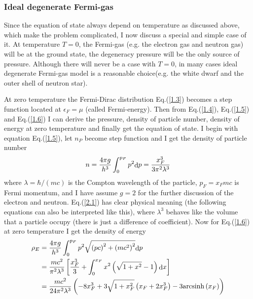 \documentclass[preprint]{revtex4-1}
\begin{document}
\subsubsection{Ideal degenerate Fermi-gas}
Since the equation of state always depend on temperature as discussed above, which make the problem complicated, I now discuss a special and simple case of it. At temperature $T=0$,  the Fermi-gas (e.g. the electron gas and neutron gas) will be at the ground state, the degeneracy pressure will be the only source of pressure. Although there will never be a case with $T=0$, in many cases ideal degenerate Fermi-gas model is a reasonable choice(e.g. the white dwarf and the outer shell of neutron star). \par
At zero temperature the Fermi-Dirac distribution Eq.(\ref{1.3}) becomes a step function located at $\epsilon_F=\mu$ (called Fermi-energy). Then from Eq.(\ref{1.4}), Eq.(\ref{1.5}) and Eq.(\ref{1.6}) I can derive the pressure, density of particle number, density of energy at zero temperature and finally get the equation of state. I begin with equation Eq.(\ref{1.5}), let $n_P$  become step function and I get the density of particle number 
\begin{equation}
n = \frac{{4\pi g}}{{{h^3}}}\int_0^{{p_F}} {{p^2}{\mathop{\rm d}\nolimits} p}  = \frac{{x_F^3}}{{3{\pi ^2}{\lambda ^3}}} \label{2.1}
\end{equation}
where $\lambda  = \hbar /\left( {mc} \right)$ is the Compton wavelength of the particle, ${p_F} = {x_F}mc$ is Fermi momentum, and I have assume $g=2$ for the further discussion of the electron and neutron. Eq.(\ref{2.1}) has clear physical meaning (the following equations can also be interpreted like this), where $\lambda^3$ behaves like the volume that a particle occupy (there is just a difference of coefficient). Now for Eq.(\ref{1.6}) at zero temperature I get the density of energy
\begin{align}
	 {\rho _E} &= {{4\pi g} \over {{h^3}}}\int_0^{{p_F}} {{p^2}\sqrt {{{\left( {pc} \right)}^2} + {{\left( {m{c^2}} \right)}^2}} {\mathop{\rm d}\nolimits} p}  \nonumber \\
	 &= {{m{c^2}} \over {{\pi ^2}{\lambda ^3}}}\left[ {{{x_F^3} \over 3} + \int_0^{{x_F}} {{x^2}\left( {\sqrt {1 + {x^2}}  - 1} \right){\mathop{\rm d}\nolimits} x} } \right]  \nonumber \\ 
	& {\rm{                                 }} = {{m{c^2}} \over {24{\pi ^2}{\lambda ^3}}}\left( { - 8x_F^3 + 3\sqrt {1 + x_F^2} \left( {{x_F} + 2x_F^3} \right) - 3{\mathop{\rm arcsinh}\nolimits} \left( {{x_F}} \right)} \right) \label{2.2}
\end{align}
\end{document}
